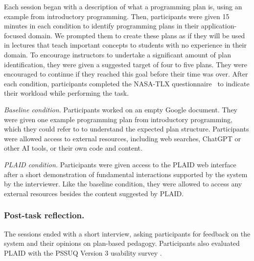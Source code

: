 Each session began with a description of what a programming plan is, using an example from introductory programming. Then, participants were given 15 minutes in each condition to identify programming plans in their application-focused domain. We prompted them to create these plans as if they will be used in lectures that teach important concepts to students with no experience in their domain. To encourage instructors to undertake a significant amount of plan identification, they were given a suggested target of four to five plans. They were encouraged to continue if they reached this goal before their time was over. %
After each condition, participants completed the NASA-TLX questionnaire~\cite{cao2009nasa} to indicate their workload while performing the task. %

\textit{Baseline condition.} Participants worked on an empty Google document. They were given one example programming plan from introductory programming, which they could refer to to understand the expected plan structure. Participants were allowed access to external resources, including web searches, ChatGPT or other AI tools, or their own code and content. 


\textit{PLAID condition.} Participants were given access to the PLAID web interface after a short demonstration of fundamental interactions supported by the system by the interviewer. Like the baseline condition, they were allowed to access any external resources besides the content suggested by PLAID.




\subsubsection{Post-task reflection.}
 
The sessions ended with a short interview, asking participants for feedback on the system and their opinions on plan-based pedagogy.
Participants also evaluated PLAID with the PSSUQ Version 3 usability survey \cite{pssuq_usability, sauro2016quantifying}. 

